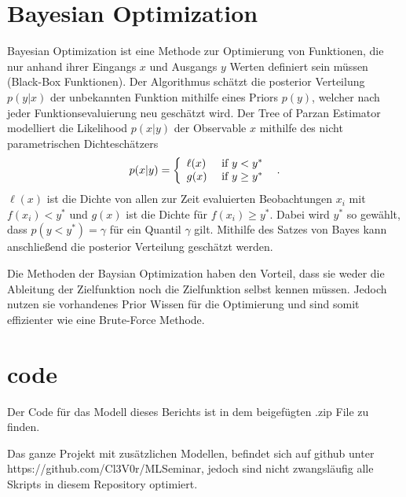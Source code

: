 \chapter{Bayesian Optimization}
\label{sec:TPE}
Bayesian Optimization ist eine Methode zur Optimierung von Funktionen, die nur anhand ihrer Eingangs $x$ und Ausgangs $y$
Werten definiert sein müssen (Black-Box Funktionen). 
Der Algorithmus schätzt die posterior Verteilung $p(y|x)$ der unbekannten Funktion mithilfe eines Priors $p(y)$, welcher 
nach jeder Funktionsevaluierung neu geschätzt wird.
Der Tree of Parzan Estimator modelliert die Likelihood $p(x|y)$ der Observable $x$ mithilfe des nicht parametrischen 
Dichteschätzers 
\begin{equation}
p(x | y)=\left\{\begin{array}{ll}{\ell(x)} & {\text { if } y<y^{*}} \\ {g(x)} & {\text { if } y \geq y^{*}}\end{array}\right. \text{\, .}
\end{equation}
$\ell(x)$ ist die Dichte von allen zur Zeit evaluierten Beobachtungen $x_i$ mit $f(x_i)<y^{*}$ und 
$g(x)$ ist die Dichte für $f(x_i) \geq y^{*}$. 
Dabei wird $y^{*}$ so gewählt, dass $p\left(y<y^{*}\right)=\gamma$ für ein Quantil $\gamma$ gilt.
Mithilfe des Satzes von Bayes kann anschließend die posterior Verteilung geschätzt werden.

Die Methoden der Baysian Optimization haben den Vorteil, dass sie weder die Ableitung der Zielfunktion noch die
Zielfunktion selbst kennen müssen. 
Jedoch nutzen sie vorhandenes Prior Wissen für die Optimierung und sind somit effizienter wie eine Brute-Force Methode.

\chapter{code}
Der Code für das Modell dieses Berichts ist in dem beigefügten .zip File zu finden. 

Das ganze Projekt mit zusätzlichen Modellen, befindet sich auf github unter https://github.com/Cl3V0r/MLSeminar,
jedoch sind nicht zwangsläufig alle Skripts in diesem Repository optimiert.
